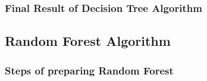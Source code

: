 \documentclass{beamer}
\begin{document}
\begin{frame}
	\frametitle{Final Result of Decision Tree Algorithm}
    \begin{figure}

    \end{figure}
    \end{frame}
\subsection{Random Forest Algorithm}
\begin{frame}
	\frametitle{Steps of preparing Random Forest}
    \begin{figure}
    \end{figure}
    \end{frame}
\end{document}
